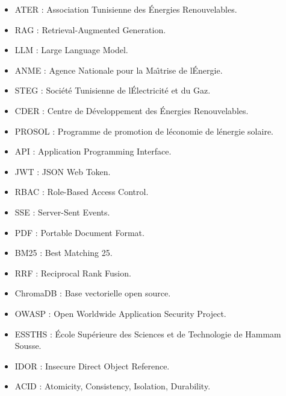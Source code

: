 \documentclass[12pt,a4paper,oneside]{report}
\begin{document}
\begin{itemize}[leftmargin=1.2cm]

\item ATER : Association Tunisienne des \'Energies Renouvelables.

\item RAG : Retrieval-Augmented Generation.

\item LLM : Large Language Model.

\item ANME : Agence Nationale pour la Ma\^{\i}trise de l\'Energie.

\item STEG : Soci\'{e}t\'{e} Tunisienne de l\'Electricit\'{e} et du Gaz.

\item CDER : Centre de D\'{e}veloppement des \'Energies Renouvelables.

\item PROSOL : Programme de promotion de l\'{e}conomie de l\'{e}nergie solaire.

\item API : Application Programming Interface.

\item JWT : JSON Web Token.

\item RBAC : Role-Based Access Control.

\item SSE : Server-Sent Events.

\item PDF : Portable Document Format.

\item BM25 : Best Matching 25.

\item RRF : Reciprocal Rank Fusion.

\item ChromaDB : Base vectorielle open source.

\item OWASP : Open Worldwide Application Security Project.

\item ESSTHS : \'{E}cole Sup\'{e}rieure des Sciences et de Technologie de Hammam Sousse.

\item IDOR : Insecure Direct Object Reference.

\item ACID : Atomicity, Consistency, Isolation, Durability.

\end{itemize}
\end{document}
